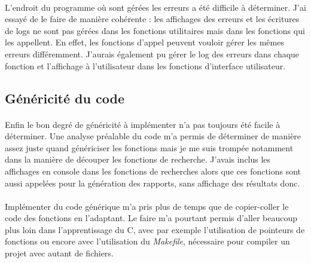 \documentclass{article}
\begin{document}
    \paragraph{}
    L'endroit du programme où sont gérées les erreurs a été difficile à déterminer. J'ai essayé de le faire de manière cohérente : les affichages des erreurs et les écritures de logs ne sont pas gérées dans les fonctions utilitaires mais dans les fonctions qui les appellent. En effet, les fonctions d'appel peuvent vouloir gérer les mêmes erreurs différemment. J'aurais également pu gérer le log des erreurs dans chaque fonction et l'affichage à l'utilisateur dans les fonctions d'interface utilisateur.


    \subsection{Généricité du code}
    \paragraph{}
    Enfin le bon degré de généricité à implémenter n'a pas toujours été facile à déterminer. Une analyse préalable du code m'a permis de déterminer de manière assez juste quand génériciser les fonctions mais je me suis trompée notamment dans la manière de découper les fonctions de recherche. J'avais inclus les affichages en console dans les fonctions de recherches alors que ces fonctions sont aussi appelées pour la génération des rapports, sans affichage des résultats donc.

    \paragraph{}
    Implémenter du code générique m'a pris plus de temps que de copier-coller le code des fonctions en l'adaptant. Le faire m'a pourtant permis d'aller beaucoup plus loin dans l'apprentissage du C, avec par exemple l'utilisation de pointeurs de fonctions ou encore avec l'utilisation du \emph{Makefile}, nécessaire pour compiler un projet avec autant de fichiers.
\end{document}
